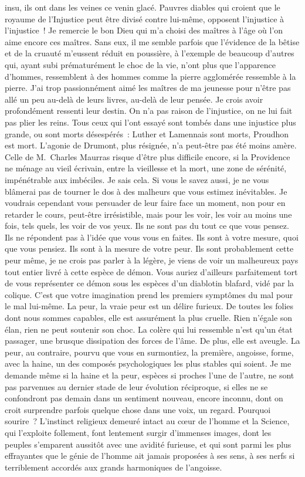 \documentclass[french,twoside]{book} %
\begin{document}
insu, ils ont dans les veines ce venin glacé. Pauvres diables qui croient que le royaume de l’Injustice peut être divisé contre lui-même, opposent l’injustice à l’injustice ! Je remercie le bon Dieu qui m’a choisi des maîtres à l’âge où l’on aime encore ces maîtres. Sans eux, il me semble parfois que l’évidence de la bêtise et de la cruauté m’eussent réduit en poussière, à l’exemple de beaucoup d’autres qui, ayant subi prématurément le choc de la vie, n’ont plus que l’apparence d’hommes, ressemblent à des hommes comme la pierre agglomérée ressemble à la pierre. J’ai trop passionnément aimé les maîtres de ma jeunesse pour n’être pas allé un peu au-delà de leurs livres, au-delà de leur pensée. Je crois avoir profondément ressenti leur destin. On n’a pas raison de l’injustice, on ne lui fait pas plier les reins. Tous ceux qui l’ont essayé sont tombés dans une injustice plus grande, ou sont morts désespérés : Luther et Lamennais sont morts, Proudhon est mort. L’agonie de Drumont, plus résignée, n’a peut-être pas été moins amère. Celle de M. Charles Maurras risque d’être plus difficile encore, si la Providence ne ménage au vieil écrivain, entre la vieillesse et la mort, une zone de sérénité, impénétrable aux imbéciles. Je sais cela. Si vous le savez aussi, je ne vous blâmerai pas de tourner le dos à des malheurs que vous estimez inévitables. Je voudrais cependant vous persuader de leur faire face un moment, non pour en retarder le cours, peut-être irrésistible, mais pour les voir, les voir au moins une fois, tels quels, les voir de vos yeux. Ils ne sont pas du tout ce que vous pensez. Ils ne répondent pas à l’idée que vous vous en faites. Ils sont à votre mesure, quoi que vous pensiez. Ils sont à la mesure de votre peur. Ils sont probablement cette peur même, je ne crois pas parler à la légère, je viens de voir un malheureux pays tout entier livré à cette espèce de démon. Vous auriez d’ailleurs parfaitement tort de vous représenter ce démon sous les espèces d’un diablotin blafard, vidé par la colique. C’est que votre imagination prend les premiers symptômes du mal pour le mal lui-même. La peur, la vraie peur est un délire furieux. De toutes les folies dont nous sommes capables, elle est assurément la plus cruelle. Rien n’égale son élan, rien ne peut soutenir son choc. La colère qui lui ressemble n’est qu’un état passager, une brusque dissipation des forces de l’âme. De plus, elle est aveugle. La peur, au contraire, pourvu que vous en surmontiez, la première, angoisse, forme, avec la haine, un des composés psychologiques les plus stables qui soient. Je me demande même si la haine et la peur, espèces si proches l’une de l’autre, ne sont pas parvenues au dernier stade de leur évolution réciproque, si elles ne se confondront pas demain dans un sentiment nouveau, encore inconnu, dont on croit surprendre parfois quelque chose dans une voix, un regard. Pourquoi sourire ? L’instinct religieux demeuré intact au cœur de l’homme et la Science, qui l’exploite follement, font lentement surgir d’immenses images, dont les peuples s’emparent aussitôt avec une avidité furieuse, et qui sont parmi les plus effrayantes que le génie de l’homme ait jamais proposées à ses sens, à ses nerfs si terriblement accordés aux grands harmoniques de l’angoisse.\par
\end{document}
